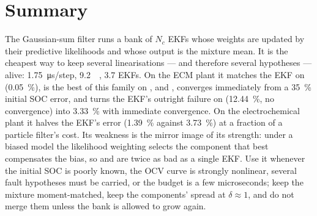 \section{Summary}
The Gaussian-sum filter runs a bank of $N_c$ EKFs whose weights are updated by their predictive
likelihoods and whose output is the mixture mean.  It is the cheapest way to keep several
linearisations --- and therefore several hypotheses --- alive: \SI{1.75}{\micro\second}/step,
\SI{9.2}{\kilo\byte}, \num{3.7} EKFs.  On the ECM plant it matches the EKF on 
(\SI{0.05}{\percent}), is the best of this family on ,  and
, converges immediately from a \SI{35}{\percent} initial SOC error, and turns the
EKF's outright failure on  (\SI{12.44}{\percent}, no convergence) into
\SI{3.33}{\percent} with immediate convergence.  On the electrochemical plant it halves the EKF's
error (\SI{1.39}{\percent} against \SI{3.73}{\percent}) at a fraction of a particle filter's cost.
Its weakness is the mirror image of its strength: under a biased model the likelihood weighting
selects the component that best compensates the bias, so  and
 are twice as bad as a single EKF.  Use it whenever the initial SOC is poorly
known, the OCV curve is strongly nonlinear, several fault hypotheses must be carried, or the budget
is a few microseconds; keep the mixture moment-matched, keep the components' spread at
$\delta\approx1$, and do not merge them unless the bank is allowed to grow again.
